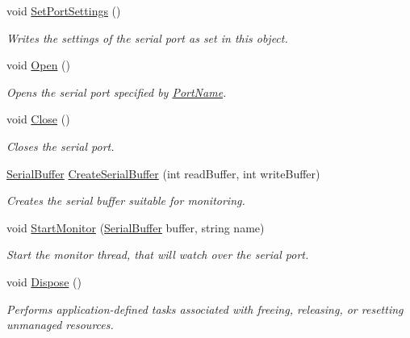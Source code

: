 \begin{DoxyCompactItemize}
void \mbox{\hyperlink{class_r_j_c_p_1_1_i_o_1_1_ports_1_1_native_1_1_win_native_serial_a662e00be7fe361aa0d49fb8530721f91}{Set\+Port\+Settings}} ()
\begin{DoxyCompactList}\small\item\em Writes the settings of the serial port as set in this object. \end{DoxyCompactList}\item 
void \mbox{\hyperlink{class_r_j_c_p_1_1_i_o_1_1_ports_1_1_native_1_1_win_native_serial_a2f975efd9e94bbc338ba4dbee68a6754}{Open}} ()
\begin{DoxyCompactList}\small\item\em Opens the serial port specified by \mbox{\hyperlink{class_r_j_c_p_1_1_i_o_1_1_ports_1_1_native_1_1_win_native_serial_a4c6f1a987cf89e84721d484d1c702070}{Port\+Name}}. \end{DoxyCompactList}\item 
void \mbox{\hyperlink{class_r_j_c_p_1_1_i_o_1_1_ports_1_1_native_1_1_win_native_serial_a4bd7bf6de34d7d8f70a4d245a00ffa77}{Close}} ()
\begin{DoxyCompactList}\small\item\em Closes the serial port. \end{DoxyCompactList}\item 
\mbox{\hyperlink{class_r_j_c_p_1_1_i_o_1_1_ports_1_1_native_1_1_serial_buffer}{Serial\+Buffer}} \mbox{\hyperlink{class_r_j_c_p_1_1_i_o_1_1_ports_1_1_native_1_1_win_native_serial_ad36215a4957349cba6078c7196dc6db3}{Create\+Serial\+Buffer}} (int read\+Buffer, int write\+Buffer)
\begin{DoxyCompactList}\small\item\em Creates the serial buffer suitable for monitoring. \end{DoxyCompactList}\item 
void \mbox{\hyperlink{class_r_j_c_p_1_1_i_o_1_1_ports_1_1_native_1_1_win_native_serial_af8513c10fdf373932ec07a2bb033d0c4}{Start\+Monitor}} (\mbox{\hyperlink{class_r_j_c_p_1_1_i_o_1_1_ports_1_1_native_1_1_serial_buffer}{Serial\+Buffer}} buffer, string name)
\begin{DoxyCompactList}\small\item\em Start the monitor thread, that will watch over the serial port. \end{DoxyCompactList}\item 
void \mbox{\hyperlink{class_r_j_c_p_1_1_i_o_1_1_ports_1_1_native_1_1_win_native_serial_a7b91c1fe65afccb7d64490c0c9e3e382}{Dispose}} ()
\begin{DoxyCompactList}\small\item\em Performs application-\/defined tasks associated with freeing, releasing, or resetting unmanaged resources. \end{DoxyCompactList}\end{DoxyCompactItemize}
